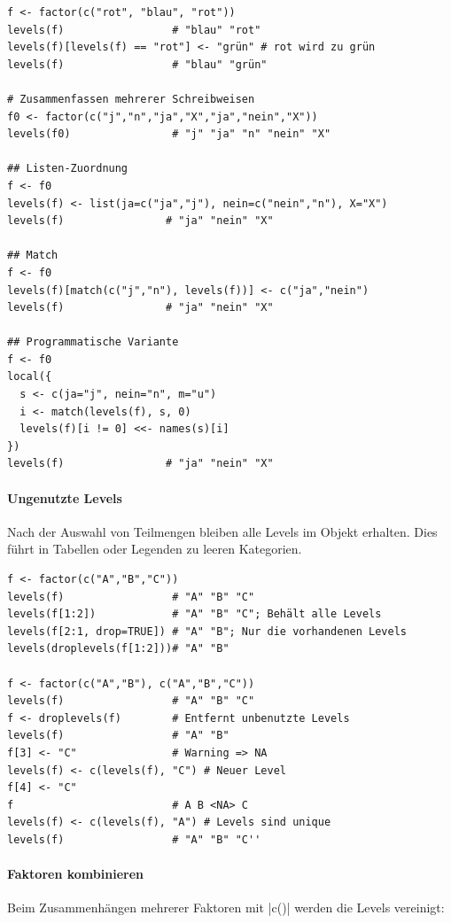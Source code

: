 \documentclass[10pt,twocolumn]{scrartcl}
\renewcommand{\lstinline}{\mycoloredinline}
\begin{document}
\begin{lstlisting}
f <- factor(c("rot", "blau", "rot"))
levels(f)                 # "blau" "rot"
levels(f)[levels(f) == "rot"] <- "grün" # rot wird zu grün
levels(f)                 # "blau" "grün"

# Zusammenfassen mehrerer Schreibweisen
f0 <- factor(c("j","n","ja","X","ja","nein","X"))
levels(f0)                # "j" "ja" "n" "nein" "X"

## Listen-Zuordnung
f <- f0
levels(f) <- list(ja=c("ja","j"), nein=c("nein","n"), X="X")
levels(f)                # "ja" "nein" "X"

## Match
f <- f0
levels(f)[match(c("j","n"), levels(f))] <- c("ja","nein")
levels(f)                # "ja" "nein" "X"

## Programmatische Variante
f <- f0
local({
  s <- c(ja="j", nein="n", m="u")
  i <- match(levels(f), s, 0)
  levels(f)[i != 0] <<- names(s)[i]
})
levels(f)                # "ja" "nein" "X"
\end{lstlisting}


\paragraph{Ungenutzte Levels}

Nach der Auswahl von Teilmengen bleiben alle Levels im Objekt erhalten. Dies führt in Tabellen oder Legenden zu leeren Kategorien.

\begin{lstlisting}
f <- factor(c("A","B","C"))
levels(f)                 # "A" "B" "C"
levels(f[1:2])            # "A" "B" "C"; Behält alle Levels
levels(f[2:1, drop=TRUE]) # "A" "B"; Nur die vorhandenen Levels
levels(droplevels(f[1:2]))# "A" "B"

f <- factor(c("A","B"), c("A","B","C"))
levels(f)                 # "A" "B" "C"
f <- droplevels(f)        # Entfernt unbenutzte Levels
levels(f)                 # "A" "B"
f[3] <- "C"               # Warning => NA
levels(f) <- c(levels(f), "C") # Neuer Level
f[4] <- "C"
f                         # A B <NA> C
levels(f) <- c(levels(f), "A") # Levels sind unique
levels(f)                 # "A" "B" "C''
\end{lstlisting}


\paragraph{Faktoren kombinieren}
Beim Zusammenhängen mehrerer Faktoren mit \lstinline|c()| werden die Levels vereinigt:
\end{document}

